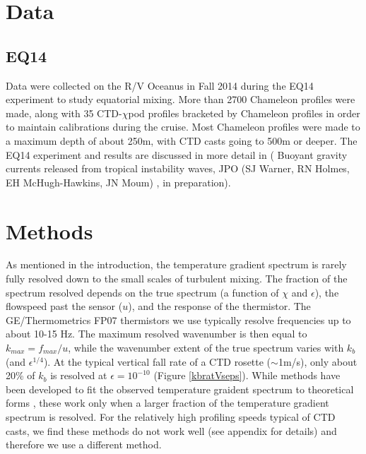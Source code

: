 \documentclass{ametsoc}
\begin{document}
\section{Data }


\subsection{EQ14}

Data were collected on the R/V Oceanus in Fall 2014 during the EQ14 experiment to study equatorial mixing.  More than 2700 Chameleon profiles were made, along with 35 CTD-$\chi$pod profiles bracketed by Chameleon profiles in order to maintain calibrations during the cruise. Most Chameleon profiles were made to a maximum depth of about 250m, with CTD casts going to 500m or deeper. The EQ14 experiment and results are discussed in more detail in ( Buoyant gravity currents released from tropical instability waves, JPO (SJ Warner, RN Holmes, EH McHugh-Hawkins, JN Moum) , in preparation).




\section{Methods}


As mentioned in the introduction, the temperature gradient spectrum is rarely fully resolved down to the small scales of turbulent mixing. The fraction of the spectrum resolved depends on the true spectrum (a function of $\chi$ and $\epsilon$), the flowspeed past the sensor ($u$), and the response of the thermistor. The GE/Thermometrics FP07 thermistors we use typically resolve frequencies up to about 10-15 Hz. The maximum resolved wavenumber is then equal to $k_{max}=f_{max}/u$, while the wavenumber extent of the true spectrum varies with $k_b$ (and $\epsilon^{1/4}$). At the typical vertical fall rate of a CTD rosette ($\sim$1m/s), only about 20\% of $k_b$ is resolved at $\epsilon=10^{-10}$ (Figure \ref{kbratVseps}). While methods have been developed to fit the observed temperature graident spectrum to theoretical forms \citep{ruddicketal00}, these work only when a larger fraction of the temperature gradient spectrum is resolved. For the relatively high profiling speeds typical of CTD casts, we find these methods do not work well (see appendix for details) and therefore we use a different method.
\end{document}
